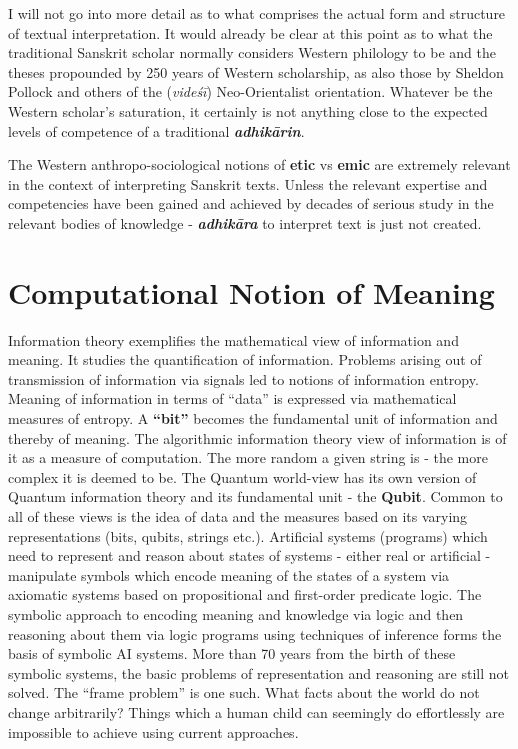 I will not go into more detail as to what comprises the actual form and structure of textual interpretation. It would already be clear at this point as to what the traditional Sanskrit scholar normally considers Western philology to be and the theses propounded by 250 years of Western scholarship, as also those by Sheldon Pollock and others of the (\textit{videśī}) Neo-Orientalist orientation. Whatever be the Western scholar’s saturation, it certainly is not anything close to the expected levels of competence of a traditional \textbf{\textit{adhikārin}}.

The Western anthropo-sociological notions of \textbf{etic} vs \textbf{emic} are extremely relevant in the context of interpreting Sanskrit texts. Unless the relevant expertise and competencies have been gained and achieved by decades of serious study in the relevant bodies of knowledge - \textbf{\textit{adhikāra}} to interpret text is just not created.


\section*{Computational Notion of Meaning}

Information theory exemplifies the mathematical view of information and meaning. It studies the quantification of information. Problems arising out of transmission of information via signals led to notions of information entropy. Meaning of information in terms of “data” is expressed via mathematical measures of entropy. A \textbf{“bit”} becomes the fundamental unit of information and thereby of meaning. The algorithmic information theory view of information is of it as a measure of computation. The more random a given string is - the more complex it is deemed to be. The Quantum world-view has its own version of Quantum information theory and its fundamental unit - the \textbf{Qubit}. Common to all of these views is the idea of data and the measures based on its varying representations (bits, qubits, strings etc.). Artificial systems (programs) which need to represent and reason about states of systems - either real or artificial - manipulate symbols which encode meaning of the states of a system via axiomatic systems based on propositional and first-order predicate logic. The symbolic approach to encoding meaning and knowledge via logic and then reasoning about them via logic programs using techniques of inference forms the basis of symbolic AI systems. More than 70 years from the birth of these symbolic systems, the basic problems of representation and reasoning are still not solved. The “frame problem” is one such. What facts about the world do not change arbitrarily? Things which a human child can seemingly do effortlessly are impossible to achieve using current approaches.

